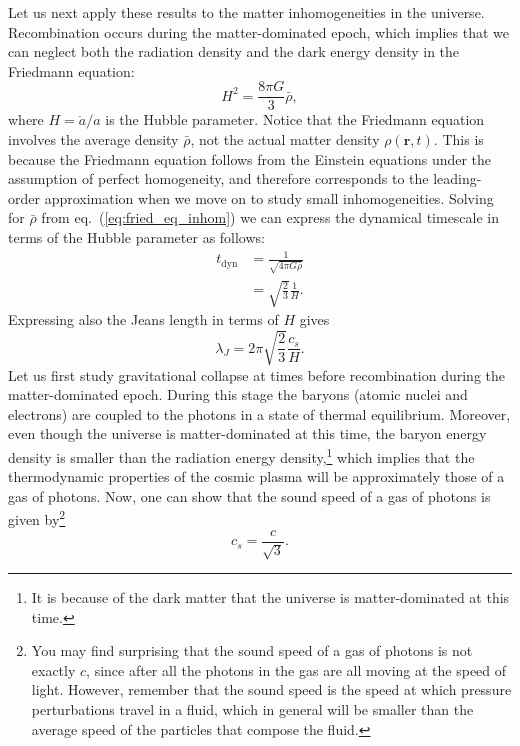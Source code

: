 Let us next apply these results to the matter inhomogeneities in the universe. Recombination occurs during the matter-dominated epoch, which implies that we can neglect both the radiation density and the dark energy density in the Friedmann equation:
\begin{equation} \label{eq:fried_eq_inhom}
H^2=\frac{8\pi G}{3}\bar{\rho},
\end{equation}
where $H=\dot{a}/a$ is the Hubble parameter. Notice that the Friedmann equation involves the average density $\bar{\rho}$, not the actual matter density $\rho(\mathbf{r},t)$. This is because the Friedmann equation follows from the Einstein equations under the assumption of perfect homogeneity, and therefore corresponds to the leading-order approximation when we move on to study small inhomogeneities. Solving for $\bar{\rho}$ from eq.\ (\ref{eq:fried_eq_inhom}) we can express the dynamical timescale in terms of the Hubble parameter as follows:
\begin{equation}
\begin{split}
t_{\mathrm{dyn}}&=\frac{1}{\sqrt{4\pi G\bar{\rho}}}\\
&=\sqrt{\frac{2}{3}}\frac{1}{H}.
\end{split}
\end{equation}
Expressing also the Jeans length in terms of $H$ gives
\begin{equation} \label{eq:jeans_hubble}
\lambda_J=2\pi\sqrt{\frac{2}{3}}\frac{c_s}{H}.
\end{equation}
Let us first study gravitational collapse at times before recombination during the matter-dominated epoch. During this stage the baryons (atomic nuclei and electrons) are coupled to the photons in a state of thermal equilibrium. Moreover, even though the universe is matter-dominated at this time, the baryon energy density is smaller than the radiation energy density,\footnote{It is because of the dark matter that the universe is matter-dominated at this time.} which implies that the thermodynamic properties of the cosmic plasma will be approximately those of a gas of photons. Now, one can show that the sound speed of a gas of photons is given by\footnote{You may find surprising that the sound speed of a gas of photons is not exactly $c$, since after all the photons in the gas are all moving at the speed of light. However, remember that the sound speed is the speed at which pressure perturbations travel in a fluid, which in general will be smaller than the average speed of the particles that compose the fluid.
}
\begin{equation}
c_s=\frac{c}{\sqrt{3}}.
\end{equation}
